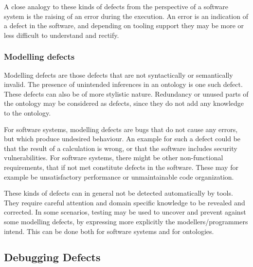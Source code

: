 A close analogy to these kinds of defects from the perspective of a software system is the raising of an error during the execution. An error is an indication of a defect in the software, and depending on tooling support they may be more or less difficult to understand and rectify.

\subsubsection{Modelling defects}

Modelling defects are those defects that are not syntactically or semantically invalid. The presence of unintended inferences in an ontology is one such defect. These defects can also be of more stylistic nature. Redundancy or unused parts of the ontology may be considered as defects, since they do not add any knowledge to the ontology.

For software systems, modelling defects are bugs that do not cause any errors, but which produce undesired behaviour. An example for such a defect could be that the result of a calculation is wrong, or that the software includes security vulnerabilities. For software systems, there might be other non-functional requirements, that if not met constitute defects in the software. These may for example be unsatisfactory performance or unmaintainable code organization.

These kinds of defects can in general not be detected automatically by tools. They require careful attention and domain specific knowledge to be revealed and corrected. In some scenarios, testing may be used to uncover and prevent against some modelling defects, by expressing more explicitly the modellers/programmers intend. This can be done both for software systems and for ontologies.

\subsection{Debugging Defects}


